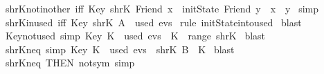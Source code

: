 \begin{isabellebody}
  \ shrK{\isacharunderscore}not{\isacharunderscore}in{\isacharunderscore}other\ {\isacharbrackleft}iff{\isacharbrackright}{\isacharcolon}\ {\isachardoublequoteopen}Key\ {\isacharparenleft}shrK\ {\isacharparenleft}Friend\ x{\isacharparenright}{\isacharparenright}\ {\isasymin}\ initState\ {\isacharparenleft}Friend\ y{\isacharparenright}\ {\isasymLongrightarrow}\ {\isacharparenleft}x\ {\isacharequal}\ y{\isacharparenright}{\isachardoublequoteclose}\isanewline
  \isadelimproof
  \endisadelimproof
  \isatagproof
  \isamarkupfalse%
  \ simp\isanewline
  \isamarkupfalse%
  \endisatagproof
  {\isafoldproof}%
  \isadelimproof
  \isanewline
  \endisadelimproof
  \isanewline
  \isanewline
  \isamarkupfalse%
  \ shrK{\isacharunderscore}in{\isacharunderscore}used\ {\isacharbrackleft}iff{\isacharbrackright}{\isacharcolon}\ {\isachardoublequoteopen}Key\ {\isacharparenleft}shrK\ A{\isacharparenright}\ {\isasymin}\ used\ evs{\isachardoublequoteclose}\isanewline
  \isadelimproof
  \endisadelimproof
  \isatagproof
  \isamarkupfalse%
  \ {\isacharparenleft}rule\ initState{\isacharunderscore}into{\isacharunderscore}used{\isacharparenright}\isanewline
  \isamarkupfalse%
  \ blast\isanewline
  \isamarkupfalse%
  \endisatagproof
  {\isafoldproof}%
  \isadelimproof
  \isanewline
  \endisadelimproof
  \isanewline
  \isanewline
  \isanewline
  \isamarkupfalse%
  \ Key{\isacharunderscore}not{\isacharunderscore}used\ {\isacharbrackleft}simp{\isacharbrackright}{\isacharcolon}\ {\isachardoublequoteopen}Key\ K\ {\isasymnotin}\ used\ evs\ {\isasymLongrightarrow}\ K\ {\isasymnotin}\ range\ shrK{\isachardoublequoteclose}\isanewline
  \isadelimproof
  \endisadelimproof
  \isatagproof
  \isamarkupfalse%
  \ blast%
  \endisatagproof
  {\isafoldproof}%
  \isadelimproof
  \isanewline
  \endisadelimproof
  \isanewline
  \isamarkupfalse%
  \ shrK{\isacharunderscore}neq\ {\isacharbrackleft}simp{\isacharbrackright}{\isacharcolon}\ {\isachardoublequoteopen}Key\ K\ {\isasymnotin}\ used\ evs\ {\isasymLongrightarrow}\ shrK\ B\ {\isasymnoteq}\ K{\isachardoublequoteclose}\isanewline
  \isadelimproof
  \endisadelimproof
  \isatagproof
  \isamarkupfalse%
  \ blast%
  \endisatagproof
  {\isafoldproof}%
  \isadelimproof
  \isanewline
  \endisadelimproof
  \isanewline
  \isamarkupfalse%
  \ shrK{\isacharunderscore}neq\ {\isacharbrackleft}THEN\ not{\isacharunderscore}sym{\isacharcomma}\ simp{\isacharbrackright}\isanewline

\end{isabellebody}
